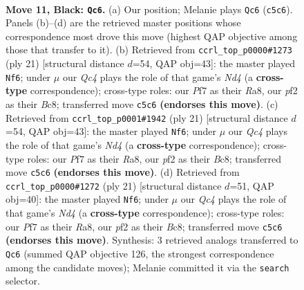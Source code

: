 \documentclass[11pt]{article}
\begin{document}
\clearpage

\begin{figure}[p]\centering
\begin{subfigure}{0.46\textwidth}\centering
\resizebox{\linewidth}{!}{%
\newchessgame
\chessboard[
  setfen={rnb2rk1/1p3ppp/p3pn2/2q5/1b6/2NBPN2/PP1B1PPP/R2Q1RK1 b - - 3 11},
  showmover=false,
  pgfstyle=straightmove, color=movearrow, markmove={c5-c6}
]}
\caption{}
\end{subfigure}\hfill
\begin{subfigure}{0.46\textwidth}\centering
\resizebox{\linewidth}{!}{%
\newchessgame
\chessboard[
  setfen={r1bq1rk1/pp3pp1/2n1p2p/3n4/1b1P4/2NB1N2/PP1BQPPP/R4RK1 b - - 3 11},
  showmover=false,
  pgfstyle=straightmove, color=movearrow, markmove={d5-f6}
]}
\caption{}
\end{subfigure}
\\[4pt]
\begin{subfigure}{0.46\textwidth}\centering
\resizebox{\linewidth}{!}{%
\newchessgame
\chessboard[
  setfen={r1bq1rk1/pp3pp1/2n1p2p/3n4/1b1P4/2NB1N2/PP1BQPPP/R4RK1 b - - 3 11},
  showmover=false,
  pgfstyle=straightmove, color=movearrow, markmove={d5-f6}
]}
\caption{}
\end{subfigure}\hfill
\begin{subfigure}{0.46\textwidth}\centering
\resizebox{\linewidth}{!}{%
\newchessgame
\chessboard[
  setfen={r1bq1rk1/pp3pp1/2n1p2p/3n4/1b1P4/2NB1N2/PP1B1PPP/2RQ1RK1 b - - 3 11},
  showmover=false,
  pgfstyle=straightmove, color=movearrow, markmove={d5-f6}
]}
\caption{}
\end{subfigure}
\caption{\textbf{Move 11, Black: \texttt{Qc6}.} (a) Our position; Melanie plays \texttt{Qc6} (\texttt{c5c6}). Panels (b)--(d) are the retrieved master positions whose correspondence most drove this move (highest QAP objective among those that transfer to it). (b) Retrieved from \texttt{ccrl\_top\_p0000\#1273} (ply 21) [structural distance $d$=54, QAP obj=43]: the master played \texttt{Nf6}; under $\mu$ our \emph{Qc4} plays the role of that game's \emph{Nd4} (a \textbf{cross-type} correspondence); cross-type roles: our \emph{P}f7 as their \emph{R}a8, our \emph{p}f2 as their \emph{B}c8; transferred move \texttt{c5c6} \textbf{(endorses this move)}. (c) Retrieved from \texttt{ccrl\_top\_p0001\#1942} (ply 21) [structural distance $d$=54, QAP obj=43]: the master played \texttt{Nf6}; under $\mu$ our \emph{Qc4} plays the role of that game's \emph{Nd4} (a \textbf{cross-type} correspondence); cross-type roles: our \emph{P}f7 as their \emph{R}a8, our \emph{p}f2 as their \emph{B}c8; transferred move \texttt{c5c6} \textbf{(endorses this move)}. (d) Retrieved from \texttt{ccrl\_top\_p0000\#1272} (ply 21) [structural distance $d$=51, QAP obj=40]: the master played \texttt{Nf6}; under $\mu$ our \emph{Qc4} plays the role of that game's \emph{Nd4} (a \textbf{cross-type} correspondence); cross-type roles: our \emph{P}f7 as their \emph{R}a8, our \emph{p}f2 as their \emph{B}c8; transferred move \texttt{c5c6} \textbf{(endorses this move)}. Synthesis: 3 retrieved analogs transferred to \texttt{Qc6} (summed QAP objective 126, the strongest correspondence among the candidate moves); Melanie committed it via the \texttt{search} selector.}
\label{fig:thought-m21}
\end{figure}
\end{document}
